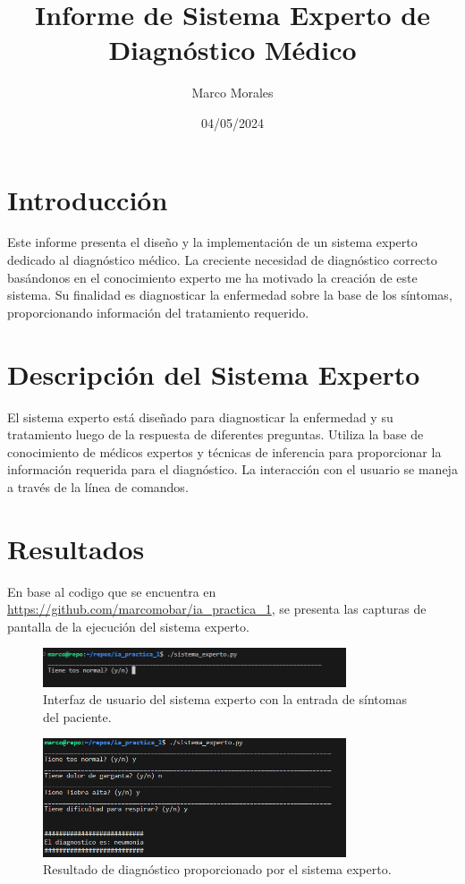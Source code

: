 \documentclass{article}
\title{Informe de Sistema Experto de Diagnóstico Médico}
\author{Marco Morales}
\date{04/05/2024}
\begin{document}
\maketitle

\section{Introducción}

Este informe presenta el diseño y la implementación de un sistema experto dedicado al diagnóstico médico. La creciente necesidad de diagnóstico correcto basándonos en el conocimiento experto me ha motivado la creación de este sistema. 
Su finalidad es diagnosticar la enfermedad sobre la base de los síntomas, proporcionando información del tratamiento requerido.

\section{Descripción del Sistema Experto}

El sistema experto está diseñado para diagnosticar la enfermedad y su tratamiento luego de la respuesta de diferentes preguntas. Utiliza la base de conocimiento de médicos expertos y técnicas de inferencia para proporcionar la información requerida para el diagnóstico. La interacción con el usuario se maneja a través de la línea de comandos.

\section{Resultados}

En base al codigo que se encuentra en \url{https://github.com/marcomobar/ia_practica_1}, se presenta las capturas de pantalla de la ejecución del sistema experto.

\begin{figure}[h!]
  \centering
  \includegraphics[width=0.8\textwidth]{1.png}
  \caption{Interfaz de usuario del sistema experto con la entrada de síntomas del paciente.}
\end{figure}

\begin{figure}[h!]
  \centering
  \includegraphics[width=0.8\textwidth]{2.png}
  \caption{Resultado de diagnóstico proporcionado por el sistema experto.}
\end{figure}
\end{document}
